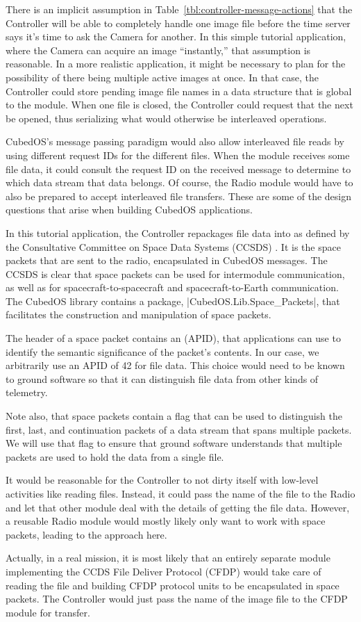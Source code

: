 There is an implicit assumption in Table~\ref{tbl:controller-message-actions} that the
Controller will be able to completely handle one image file before the time server says it's
time to ask the Camera for another. In this simple tutorial application, where the Camera can
acquire an image ``instantly,'' that assumption is reasonable. In a more realistic application,
it might be necessary to plan for the possibility of there being multiple active images at once.
In that case, the Controller could store pending image file names in a data structure that is
global to the module. When one file is closed, the Controller could request that the next be
opened, thus serializing what would otherwise be interleaved operations.

CubedOS's message passing paradigm would also allow interleaved file reads by using different
request IDs for the different files. When the module receives some file data, it could consult
the request ID on the received message to determine to which data stream that data belongs. Of
course, the Radio module would have to also be prepared to accept interleaved file transfers.
These are some of the design questions that arise when building CubedOS applications.

In this tutorial application, the Controller repackages file data into 
as defined by the Consultative Committee on Space Data Systems (CCSDS) . It
is the space packets that are sent to the radio, encapsulated in CubedOS messages. The CCSDS is
clear that space packets can be used for intermodule communication, as well as for
spacecraft-to-spacecraft and spacecraft-to-Earth communication. The CubedOS library contains a
package, |CubedOS.Lib.Space_Packets|, that facilitates the construction and manipulation of space
packets.

The header of a space packet contains an  (APID), that applications can
use to identify the semantic significance of the packet's contents. In our case, we arbitrarily
use an APID of 42 for file data. This choice would need to be known to ground software so that
it can distinguish file data from other kinds of telemetry.

Note also, that space packets contain a flag that can be used to distinguish the first, last,
and continuation packets of a data stream that spans multiple packets. We will use that flag to
ensure that ground software understands that multiple packets are used to hold the data from a
single file.

It would be reasonable for the Controller to not dirty itself with low-level activities
like reading files. Instead, it could pass the name of the file to the Radio and let that
other module deal with the details of getting the file data. However, a reusable Radio module
would mostly likely only want to work with space packets, leading to the approach here.

Actually, in a real mission, it is most likely that an entirely separate module implementing the
CCDS File Deliver Protocol (CFDP) would take care of reading the file and building CFDP protocol
units to be encapsulated in space packets. The Controller would just pass the name of the image
file to the CFDP module for transfer.
